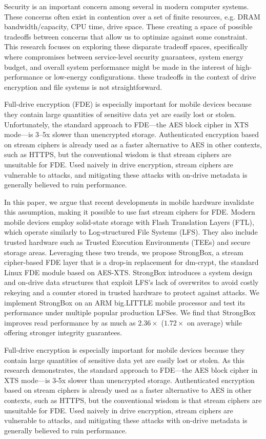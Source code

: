 Security is an important concern among several in modern computer systems. These
concerns often exist in contention over a set of finite resources, e.g. DRAM
bandwidth/capacity, CPU time, drive space. These creating a space of possible
tradeoffs between concerns that allow us to optimize against some constraint.
This research focuses on exploring these disparate tradeoff spaces, specifically
where compromises between service-level security guarantees, system energy
budget, and overall system performance might be made in the interest of
high-performance or low-energy configurations.  these tradeoffs in the context
of drive encryption and file systems is not straightforward.

Full-drive encryption (FDE) is especially important for mobile devices because
they contain large quantities of sensitive data yet are easily lost or stolen.
Unfortunately, the standard approach to FDE---the AES block cipher in XTS
mode---is 3--5x slower than unencrypted storage. Authenticated encryption based
on stream ciphers is already used as a faster alternative to AES in other
contexts, such as HTTPS, but the conventional wisdom is that stream ciphers are
unsuitable for FDE. Used naively in drive encryption, stream ciphers are
vulnerable to attacks, and mitigating these attacks with on-drive metadata is
generally believed to ruin performance.

In this paper, we argue that recent developments in mobile hardware invalidate
this assumption, making it possible to use fast stream ciphers for FDE. Modern
mobile devices employ solid-state storage with Flash Translation Layers (FTL),
which operate similarly to Log-structured File Systems (LFS). They also include
trusted hardware such as Trusted Execution Environments (TEEs) and secure
storage areas. Leveraging these two trends, we propose StrongBox, a stream
cipher-based FDE layer that is a drop-in replacement for dm-crypt, the standard
Linux FDE module based on AES-XTS. StrongBox introduces a system design and
on-drive data structures that exploit LFS's lack of overwrites to avoid costly
rekeying and a counter stored in trusted hardware to protect against attacks. We
implement StrongBox on an ARM big.LITTLE mobile processor and test its
performance under multiple popular production LFSes. We find that StrongBox
improves read performance by as much as $2.36\times$ ($1.72\times$ on average)
while offering stronger integrity guarantees.

Full-drive encryption is especially important for mobile devices because they
contain large quantities of sensitive data yet are easily lost or stolen. As
this research demonstrates, the standard approach to FDE—the AES block cipher in
XTS mode—is 3-5x slower than unencrypted storage. Authenticated encryption based
on stream ciphers is already used as a faster alternative to AES in other
contexts, such as HTTPS, but the conventional wisdom is that stream ciphers are
unsuitable for FDE. Used naively in drive encryption, stream ciphers are
vulnerable to attacks, and mitigating these attacks with on-drive metadata is
generally believed to ruin performance.

